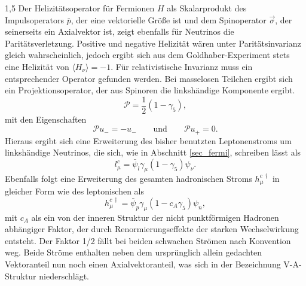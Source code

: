 \documentclass[11pt,a4paper,twoside]{report}
\begin{document}
\begin{spacing}{1,5}
Der Helizitätsoperator für Fermionen $H$ als Skalarprodukt des Impulsoperators $\bar p$, der eine vektorielle Größe ist und dem Spinoperator $\vec \sigma$, 
der seinerseits ein Axialvektor ist, zeigt ebenfalls für Neutrinos die Paritätsverletzung. Positive und negative Helizität wären unter
Paritätsinvarianz gleich wahrscheinlich, jedoch ergibt sich aus dem Goldhaber-Experiment stets eine Helizität von $\langle H_\nu \rangle= -1$. Für relativistische
Invarianz muss ein entsprechender Operator gefunden werden. Bei masselosen Teilchen ergibt sich ein Projektionsoperator, der aus Spinoren die linkshändige 
Komponente ergibt.
\begin{equation}
 \mathcal{P} = \frac12(1-\gamma_5),
\end{equation}
mit den Eigenschaften
\begin{equation}
 \mathcal{P}u_- = -u_- \qquad \text{und}\qquad \mathcal{P}u_+ = 0.
\end{equation}
Hieraus ergibt sich eine Erweiterung des bisher benutzten Leptonenstroms um linkshändige Neutrinos, die sich, wie in Abschnitt \ref{sec_fermi}, schreiben lässt als
\begin{equation}
 l_\mu^c = \bar \psi_l \gamma_\mu (1-\gamma_5) \psi_\nu.
\end{equation}
Ebenfalls folgt eine Erweiterung des gesamten hadronischen Stroms $h_\mu^{c\,\dagger}$ in gleicher Form wie des leptonischen als
\begin{equation}
 h_\mu^{c\,\dagger} = \bar \psi_p \gamma_\mu(1-c_A\gamma_5)\psi_n,
\end{equation}
mit $c_A$ als ein von der inneren Struktur der nicht punktförmigen Hadronen abhängiger Faktor, der durch Renormierungseffekte der starken Wechselwirkung entsteht.
Der Faktor 1/2 fällt bei beiden schwachen Strömen nach Konvention weg. 
Beide Ströme enthalten neben dem ursprünglich allein gedachten Vektoranteil nun noch einen Axialvektoranteil, was sich in der Bezeichnung V-A-Struktur
niederschlägt.


\end{spacing}
\end{document}

